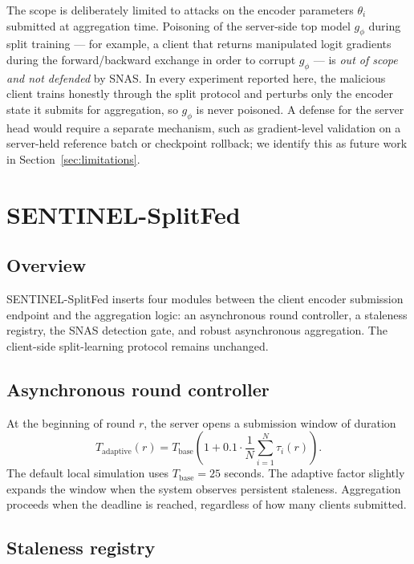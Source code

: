 \documentclass[pdflatex,sn-mathphys-num]{sn-jnl}
\begin{document}
The scope is deliberately limited to attacks on the encoder parameters $\theta_i$ submitted at aggregation time. Poisoning of the server-side top model $g_\phi$ during split training --- for example, a client that returns manipulated logit gradients during the forward/backward exchange in order to corrupt $g_\phi$ --- is \emph{out of scope and not defended} by SNAS. In every experiment reported here, the malicious client trains honestly through the split protocol and perturbs only the encoder state it submits for aggregation, so $g_\phi$ is never poisoned. A defense for the server head would require a separate mechanism, such as gradient-level validation on a server-held reference batch or checkpoint rollback; we identify this as future work in Section~\ref{sec:limitations}.

\section{SENTINEL-SplitFed}\label{sec:method}

\subsection{Overview}

SENTINEL-SplitFed inserts four modules between the client encoder submission endpoint and the aggregation logic: an asynchronous round controller, a staleness registry, the SNAS detection gate, and robust asynchronous aggregation. The client-side split-learning protocol remains unchanged.

\subsection{Asynchronous round controller}

At the beginning of round $r$, the server opens a submission window of duration
\begin{equation}
    T_{\mathrm{adaptive}}(r) = T_{\mathrm{base}}\left(1 + 0.1\cdot \frac{1}{N}\sum_{i=1}^{N}\tau_i(r)\right).
\end{equation}
The default local simulation uses $T_{\mathrm{base}}=25$ seconds. The adaptive factor slightly expands the window when the system observes persistent staleness. Aggregation proceeds when the deadline is reached, regardless of how many clients submitted.

\subsection{Staleness registry}
\end{document}
